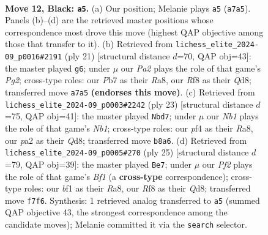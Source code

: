 \documentclass[11pt]{article}
\begin{document}
\clearpage

\begin{figure}[p]\centering
\begin{subfigure}{0.46\textwidth}\centering
\resizebox{\linewidth}{!}{%
\newchessgame
\chessboard[
  setfen={rnbq1rk1/pp1n1ppp/2p1p3/3pP3/3P1P2/2N5/PPP3PP/2RQKBNR b K - 1 12},
  showmover=false,
  pgfstyle=straightmove, color=movearrow, markmove={a7-a5}
]}
\caption{}
\end{subfigure}\hfill
\begin{subfigure}{0.46\textwidth}\centering
\resizebox{\linewidth}{!}{%
\newchessgame
\chessboard[
  setfen={r2qkb1r/1p2nppp/p2p1n2/3Pp3/2P5/1N2BP2/PP4PP/R2QKB1R b KQkq - 0 11},
  showmover=false,
  pgfstyle=straightmove, color=movearrow, markmove={g7-g6}
]}
\caption{}
\end{subfigure}
\\[4pt]
\begin{subfigure}{0.46\textwidth}\centering
\resizebox{\linewidth}{!}{%
\newchessgame
\chessboard[
  setfen={rn1q1rk1/4ppbp/2pp1np1/1p6/p2PP3/2P2N1P/PPB2PP1/R1BQR1K1 b - - 2 12},
  showmover=false,
  pgfstyle=straightmove, color=movearrow, markmove={b8-d7}
]}
\caption{}
\end{subfigure}\hfill
\begin{subfigure}{0.46\textwidth}\centering
\resizebox{\linewidth}{!}{%
\newchessgame
\chessboard[
  setfen={r2qkb1r/1p3pp1/p2p1nnp/3Pp3/2P5/1N2BP2/PP1Q2PP/R3KB1R b KQkq - 1 13},
  showmover=false,
  pgfstyle=straightmove, color=movearrow, markmove={f8-e7}
]}
\caption{}
\end{subfigure}
\caption{\textbf{Move 12, Black: \texttt{a5}.} (a) Our position; Melanie plays \texttt{a5} (\texttt{a7a5}). Panels (b)--(d) are the retrieved master positions whose correspondence most drove this move (highest QAP objective among those that transfer to it). (b) Retrieved from \texttt{lichess\_elite\_2024-09\_p0016\#2191} (ply 21) [structural distance $d$=70, QAP obj=43]: the master played \texttt{g6}; under $\mu$ our \emph{Pa2} plays the role of that game's \emph{Pg2}; cross-type roles: our \emph{P}b7 as their \emph{R}a8, our \emph{R}f8 as their \emph{Q}d8; transferred move \texttt{a7a5} \textbf{(endorses this move)}. (c) Retrieved from \texttt{lichess\_elite\_2024-09\_p0003\#2242} (ply 23) [structural distance $d$=75, QAP obj=41]: the master played \texttt{Nbd7}; under $\mu$ our \emph{Nb1} plays the role of that game's \emph{Nb1}; cross-type roles: our \emph{p}f4 as their \emph{R}a8, our \emph{p}a2 as their \emph{Q}d8; transferred move \texttt{b8a6}. (d) Retrieved from \texttt{lichess\_elite\_2024-09\_p0005\#270} (ply 25) [structural distance $d$=79, QAP obj=39]: the master played \texttt{Be7}; under $\mu$ our \emph{Pf2} plays the role of that game's \emph{Bf1} (a \textbf{cross-type} correspondence); cross-type roles: our \emph{b}f1 as their \emph{R}a8, our \emph{R}f8 as their \emph{Q}d8; transferred move \texttt{f7f6}. Synthesis: 1 retrieved analog transferred to \texttt{a5} (summed QAP objective 43, the strongest correspondence among the candidate moves); Melanie committed it via the \texttt{search} selector.}
\label{fig:thought-m23}
\end{figure}
\end{document}
